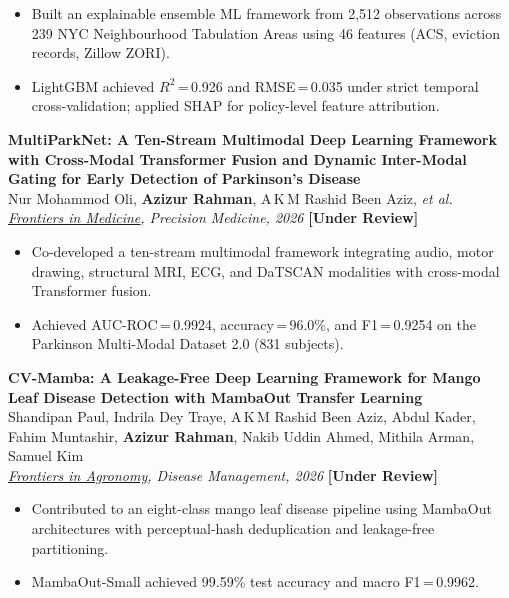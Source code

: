 \documentclass[11pt, letterpaper]{article}
\newcommand{\pubentry}[4]{%
  \noindent\textbf{#1}\\[1pt]
  \noindent #2\\[1pt]
  \noindent\textit{#3} \hfill \textbf{[#4]}\\[4pt]
}
\begin{document}
\begin{itemize}
  \item Built an explainable ensemble ML framework from 2,512 observations across 239 NYC
        Neighbourhood Tabulation Areas using 46 features (ACS, eviction records, Zillow ZORI).
  \item LightGBM achieved $R^{2}$\,=\,0.926 and RMSE\,=\,0.035 under strict temporal
        cross-validation; applied SHAP for policy-level feature attribution.
\end{itemize}

\vspace{6pt}

\pubentry
  {MultiParkNet: A Ten-Stream Multimodal Deep Learning Framework with Cross-Modal
   Transformer Fusion and Dynamic Inter-Modal Gating for Early Detection of
   Parkinson's Disease}
  {Nur Mohammod Oli, \textbf{Azizur Rahman}, A\,K\,M Rashid Been Aziz, \textit{et al.}}
  {\href{https://www.frontiersin.org/journals/medicine}{\underline{Frontiers in Medicine}}, Precision Medicine, 2026}
  {Under Review}

\begin{itemize}
  \item Co-developed a ten-stream multimodal framework integrating audio, motor drawing,
        structural MRI, ECG, and DaTSCAN modalities with cross-modal Transformer fusion.
  \item Achieved AUC-ROC\,=\,0.9924, accuracy\,=\,96.0\%, and F1\,=\,0.9254 on the
        Parkinson Multi-Modal Dataset 2.0 (831 subjects).
\end{itemize}

\vspace{6pt}

\pubentry
  {CV-Mamba: A Leakage-Free Deep Learning Framework for Mango Leaf Disease
   Detection with MambaOut Transfer Learning}
  {Shandipan Paul, Indrila Dey Traye, A\,K\,M Rashid Been Aziz, Abdul Kader,
   Fahim Muntashir, \textbf{Azizur Rahman}, Nakib Uddin Ahmed, Mithila Arman,
   Samuel Kim}
  {\href{https://www.frontiersin.org/journals/agronomy}{\underline{Frontiers in Agronomy}}, Disease Management, 2026}
  {Under Review}

\begin{itemize}
  \item Contributed to an eight-class mango leaf disease pipeline using MambaOut
        architectures with perceptual-hash deduplication and leakage-free partitioning.
  \item MambaOut-Small achieved 99.59\% test accuracy and macro F1\,=\,0.9962.
\end{itemize}
\end{document}
